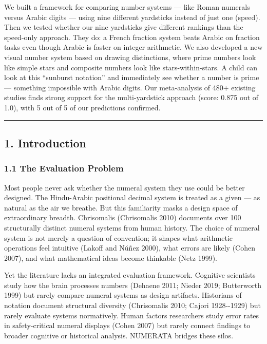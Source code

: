 \documentclass[
]{article}
\begin{document}
We built a framework for comparing number systems --- like Roman
numerals versus Arabic digits --- using nine different yardsticks
instead of just one (speed). Then we tested whether our nine yardsticks
give different rankings than the speed-only approach. They do: a French
fraction system beats Arabic on fraction tasks even though Arabic is
faster on integer arithmetic. We also developed a new visual number
system based on drawing distinctions, where prime numbers look like
simple stars and composite numbers look like stars-within-stars. A child
can look at this ``sunburst notation'' and immediately see whether a
number is prime --- something impossible with Arabic digits. Our
meta-analysis of 480+ existing studies finds strong support for the
multi-yardstick approach (score: 0.875 out of 1.0), with 5 out of 5 of
our predictions confirmed.

\begin{center}\rule{0.5\linewidth}{0.5pt}\end{center}

\subsection{1. Introduction}\label{introduction}

\subsubsection{1.1 The Evaluation Problem}\label{the-evaluation-problem}

Most people never ask whether the numeral system they use could be
better designed. The Hindu-Arabic positional decimal system is treated
as a given --- as natural as the air we breathe. But this familiarity
masks a design space of extraordinary breadth. Chrisomalis (Chrisomalis
2010) documents over 100 structurally distinct numeral systems from
human history. The choice of numeral system is not merely a question of
convention; it shapes what arithmetic operations feel intuitive (Lakoff
and Núñez 2000), what errors are likely (Cohen 2007), and what
mathematical ideas become thinkable (Netz 1999).

Yet the literature lacks an integrated evaluation framework. Cognitive
scientists study how the brain processes numbers (Dehaene 2011; Nieder
2019; Butterworth 1999) but rarely compare numeral systems as design
artifacts. Historians of notation document structural diversity
(Chrisomalis 2010; Cajori 1928-\/-1929) but rarely evaluate systems
normatively. Human factors researchers study error rates in
safety-critical numeral displays (Cohen 2007) but rarely connect
findings to broader cognitive or historical analysis. NUMERATA bridges
these silos.
\end{document}
